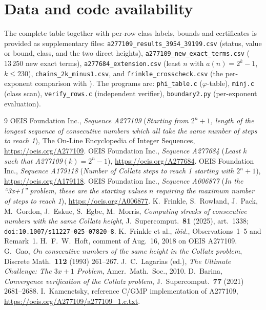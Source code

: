 \documentclass[11pt]{article}
\theoremstyle{remark}
\begin{document}
\section{Data and code availability}
The complete table together with per-row class labels, bounds and certificates is provided as
supplementary files:
\texttt{a277109\_results\_3954\_39199.csv} (status, value or bound, class, and the two direct heights),
\texttt{a277109\_new\_exact\_terms.csv} ($13\,250$ new exact terms),
\texttt{a277684\_extension.csv} (least $n$ with $a(n)=2^k-1$, $k\le230$),
\texttt{chains\_2k\_minus1.csv}, and \texttt{frinkle\_crosscheck.csv} (the per-exponent comparison
with \cite{frinkle2025}). The programs are: \texttt{phi\_table.c} ($\varphi$-table),
\texttt{minj.c} (class scan), \texttt{verify\_rows.c} (independent verifier),
\texttt{boundary2.py} (per-exponent evaluation).

\begin{thebibliography}{9}
 OEIS Foundation Inc., \emph{Sequence A277109} (\emph{Starting from $2^n+1$,
length of the longest sequence of consecutive numbers which all take the same number of steps to reach
1}), The On-Line Encyclopedia of Integer Sequences, \url{https://oeis.org/A277109}.
 OEIS Foundation Inc., \emph{Sequence A277684} (\emph{Least $k$ such that
A277109$(k)=2^n-1$}), \url{https://oeis.org/A277684}.
 OEIS Foundation Inc., \emph{Sequence A179118} (\emph{Number of Collatz steps to
reach 1 starting with $2^n+1$}), \url{https://oeis.org/A179118}.
 OEIS Foundation Inc., \emph{Sequence A006877} (\emph{In the ``3x+1'' problem,
these are the starting values $n$ requiring the maximum number of steps to reach 1}),
\url{https://oeis.org/A006877}.
 K.~Frinkle, S.~Rowland, J.~Pack, M.~Gordon, J.~Eskue, S.~Egbe, M.~Morris,
\emph{Computing streaks of consecutive numbers with the same Collatz height},
J.\ Supercomput.\ \textbf{81} (2025), art.\ 1338; \texttt{doi:10.1007/s11227-025-07820-8}.
 K.~Frinkle et al., \emph{ibid.}, Observations~1--5 and Remark~1.
 H.~F.~W.~Hoft, comment of Aug.~16, 2018 on OEIS A277109.
 G.~Gao, \emph{On consecutive numbers of the same height in the Collatz problem},
Discrete Math.\ \textbf{112} (1993) 261--267.
 J.~C.~Lagarias (ed.), \emph{The Ultimate Challenge: The $3x+1$ Problem},
Amer.\ Math.\ Soc., 2010.
 D.~Barina, \emph{Convergence verification of the Collatz problem},
J.\ Supercomput.\ \textbf{77} (2021) 2681--2688.
 I.~Kamenetsky, reference C/GMP implementation of A277109,
\url{https://oeis.org/A277109/a277109_1.c.txt}.
\end{thebibliography}
\end{document}
